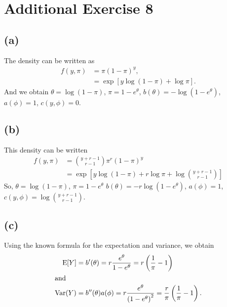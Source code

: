 \section*{Additional Exercise 8}
\subsection*{(a)}
The density can be written as
\begin{align*}
f(y,\pi) & = \pi(1-\pi)^{y},  \\
         & = \exp\left[y \log(1-\pi) + \log\pi\right].
\end{align*}
And we obtain $\theta = \log(1-\pi)$, $\pi = 1-e^{\theta}$, $b(\theta) = -\log\left(1-e^{\theta}\right)$, $a(\phi) = 1$, $c(y,\phi) = 0$.

\subsection*{(b)}
This density can be written
\begin{align*}
f(y,\pi) & = \binom{y+r-1}{r-1}\pi^{r}(1-\pi)^{y} \\ 
         & = \exp\left[y \log(1-\pi) + r\log\pi + \log\binom{y+r-1}{r-1}\right]
\end{align*}
So, $\theta = \log(1-\pi)$, $\pi = 1 -e^{\theta}$ $b(\theta) =-r\log\left(1-e^{\theta}\right)$, $a(\phi) = 1$, $c(y,\phi) = \log\binom{y+r-1}{r-1}$.\\

\subsection*{(c)}
Using the known formula for the expectation and variance, we obtain
\begin{align*}
\mathrm{E}[Y] &= b'(\theta) = r\frac{e^{\theta}}{1-e^{\theta}} = r\left(\frac{1}{\pi}-1\right)\\ \intertext{and}
\mathrm{Var}(Y) &= b''(\theta) a(\phi) = r\frac{e^{\theta}}{\left(1-e^{\theta}\right)^2} = \frac{r}{\pi}\left(\frac{1}{\pi}-1\right).
\end{align*}